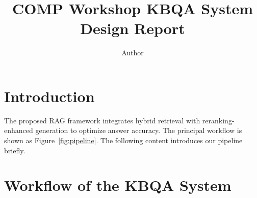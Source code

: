 \documentclass[twoside]{article}
\begin{document}
\setlength{\parskip}{10pt plus 2pt minus 2pt}
\setlength{\parindent}{15pt}


\title{COMP Workshop KBQA System Design Report}

\author{Author}

\maketitle

\setlength{\parskip}{10pt plus 2pt minus 2pt}
\setlength{\parindent}{15pt}

\section{Introduction}

The proposed RAG framework integrates hybrid retrieval with reranking-enhanced generation to optimize answer accuracy. The principal workflow is shown as Figure~\ref{fig:pipeline}. The following content introduces our pipeline briefly.

\section{Workflow of the KBQA System}
\end{document}
